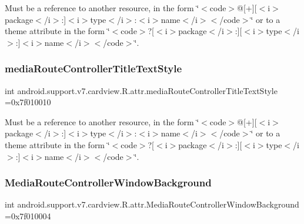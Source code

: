Must be a reference to another resource, in the form \char`\"{}$<$code$>$@\mbox{[}+\mbox{]}\mbox{[}$<$i$>$package$<$/i$>$\+:\mbox{]}$<$i$>$type$<$/i$>$\+:$<$i$>$name$<$/i$>$$<$/code$>$\char`\"{} or to a theme attribute in the form \char`\"{}$<$code$>$?\mbox{[}$<$i$>$package$<$/i$>$\+:\mbox{]}\mbox{[}$<$i$>$type$<$/i$>$\+:\mbox{]}$<$i$>$name$<$/i$>$$<$/code$>$\char`\"{}. \mbox{\label{classandroid_1_1support_1_1v7_1_1cardview_1_1R_1_1attr_a95f6de34da723fbef68a673b7161ce62}} 
\subsubsection{\texorpdfstring{media\+Route\+Controller\+Title\+Text\+Style}{mediaRouteControllerTitleTextStyle}}
{\footnotesize\ttfamily int android.\+support.\+v7.\+cardview.\+R.\+attr.\+media\+Route\+Controller\+Title\+Text\+Style =0x7f010010\hspace{0.3cm}{\ttfamily [static]}}

Must be a reference to another resource, in the form \char`\"{}$<$code$>$@\mbox{[}+\mbox{]}\mbox{[}$<$i$>$package$<$/i$>$\+:\mbox{]}$<$i$>$type$<$/i$>$\+:$<$i$>$name$<$/i$>$$<$/code$>$\char`\"{} or to a theme attribute in the form \char`\"{}$<$code$>$?\mbox{[}$<$i$>$package$<$/i$>$\+:\mbox{]}\mbox{[}$<$i$>$type$<$/i$>$\+:\mbox{]}$<$i$>$name$<$/i$>$$<$/code$>$\char`\"{}. \mbox{\label{classandroid_1_1support_1_1v7_1_1cardview_1_1R_1_1attr_abe7ef963fa013a0185f9c3515bec1596}} 
\subsubsection{\texorpdfstring{Media\+Route\+Controller\+Window\+Background}{MediaRouteControllerWindowBackground}}
{\footnotesize\ttfamily int android.\+support.\+v7.\+cardview.\+R.\+attr.\+Media\+Route\+Controller\+Window\+Background =0x7f010004\hspace{0.3cm}{\ttfamily [static]}}

